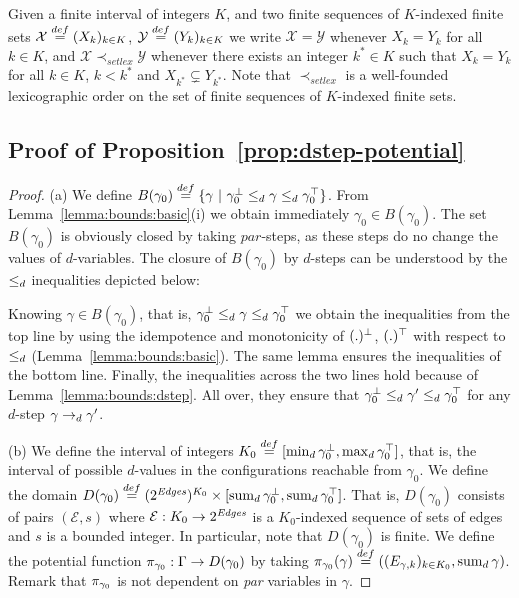 Given a finite interval of integers $K$, and two finite sequences of
$K$-indexed finite sets $\mathcal{X} \stackrel{def}= (X_k)_{k \in K}$,
$\mathcal{Y} \stackrel{def}= (Y_k)_{k \in K}$ we write $\mathcal{X} =
\mathcal{Y}$ whenever $X_k = Y_k$ for all $k \in K$, and $\mathcal{X}
\prec_{setlex} \mathcal{Y}$ whenever there exists an integer $k^* \in
K$ such that $X_k = Y_k$ for all $k \in K$, $k<k^*$ and $X_{k^*}
\subsetneq Y_{k^*}$.  Note that $\prec_{setlex}$ is a well-founded
lexicographic order on the set of finite sequences of $K$-indexed
finite sets.


\subsection*{Proof of Proposition~\ref{prop:dstep-potential}}
\begin{proof}
  (a) We define $B(\gamma_0) \stackrel{def}= \{ \gamma ~|~ \gamma_0^{\bot}
  \le_d \gamma \le_d \gamma_0^{\top} \}$.  From
  Lemma~\ref{lemma:bounds:basic}(i) we obtain immediately $\gamma_0 \in
  B(\gamma_0)$.  The set $B(\gamma_0)$ is obviously closed by taking
  $par$-steps, as these steps do no change the values of $d$-variables.
  The closure of $B(\gamma_0)$ by $d$-steps can be understood by the
  $\le_d$ inequalities depicted below:

  \begin{center}
    
  \end{center}
  
  Knowing $\gamma \in B(\gamma_0)$, that is, $\gamma_0^{\bot} \le_d
  \gamma \le_d \gamma_0^{\top}$ we obtain the inequalities from the
  top line by using the idempotence and monotonicity of
  $(.)^{\bot}$, $(.)^{\top}$ with respect to $\le_d$
  (Lemma~\ref{lemma:bounds:basic}). The same lemma ensures the
  inequalities of the bottom line.  Finally, the inequalities across
  the two lines hold because of Lemma~\ref{lemma:bounds:dstep}.  All
  over, they ensure that $\gamma_0^{\bot} \le_d \gamma' \le_d
  \gamma_0^{\top}$ for any $d$-step $\gamma\rightarrow_d\gamma'$.
  
  (b) We define the interval of integers $K_0 \stackrel{def}= [\min\nolimits_d
    \gamma_0^{\bot}, \max\nolimits_d \gamma_0^{\top}]$, that is, the interval of
  possible $d$-values in the configurations reachable from $\gamma_0$.
  We define the domain $D(\gamma_0) \stackrel{def}= (2^\mathit{Edges})^{K_0} \times
  [\mathop{\mathrm{sum}_d} \gamma_0^{\bot}, \mathop{\mathrm{sum}_d} \gamma_0^{\top}]$. That is,
  $D(\gamma_0)$ consists of pairs $(\mathcal{E},s)$ where $\mathcal{E}
  : K_0 \rightarrow 2^\mathit{Edges}$ is a $K_0$-indexed sequence of sets of
  edges and $s$ is a bounded integer.  In particular, note that
  $D(\gamma_0)$ is finite.  We define the potential function
  $\pi_{\gamma_0} : \Gamma \rightarrow D(\gamma_0)$ by taking
  $\pi_{\gamma_0}(\gamma) \stackrel{def}= ((E_{\gamma,k})_{k\in K_0},
  \mathop{\mathrm{sum}_d}\gamma)$.  Remark that $\pi_{\gamma_0}$ is not dependent on
  \textit{par} variables in $\gamma$.


\end{proof}
